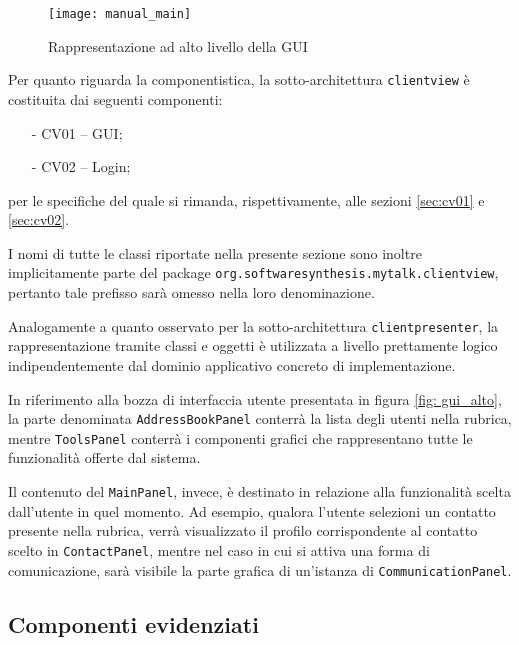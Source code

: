 \begin{figure}[h]
  \centering
  \texttt{[image: manual\_main]}
  \caption{Rappresentazione ad alto livello della GUI}\label{fig: gui_alto}
\end{figure}

Per quanto riguarda la componentistica, la sotto-architettura \texttt{clientview} è costituita dai seguenti componenti:
\begin{itemize}[noitemsep,nolistsep]
  \item[-] \textsf{CV01 -- GUI};
  \item[-] \textsf{CV02 -- Login};
\end{itemize}
per le specifiche del quale si rimanda, rispettivamente, alle sezioni \ref{sec:cv01} e \ref{sec:cv02}.

I nomi di tutte le classi riportate nella presente sezione sono inoltre implicitamente parte del package \texttt{org.softwaresynthesis.mytalk.clientview}, pertanto tale prefisso sarà omesso nella loro denominazione.

Analogamente a quanto osservato per la sotto-architettura \texttt{clientpresenter}, la rappresentazione tramite classi e oggetti è utilizzata a livello prettamente logico indipendentemente dal dominio applicativo concreto di implementazione.

In riferimento alla bozza di interfaccia utente presentata in figura \vref{fig: gui_alto}, la parte denominata \texttt{AddressBookPanel} conterrà la lista degli utenti nella rubrica, mentre \texttt{ToolsPanel} conterrà i componenti grafici che rappresentano tutte le funzionalità offerte dal sistema. 

Il contenuto del \texttt{MainPanel}, invece, è destinato in relazione alla funzionalità scelta dall'utente in quel momento. Ad esempio, qualora l'utente selezioni un contatto presente nella rubrica, verrà visualizzato il profilo corrispondente al contatto scelto in \texttt{ContactPanel}, mentre nel caso in cui si attiva una forma di comunicazione, sarà visibile la parte grafica di un'istanza di \texttt{CommunicationPanel}.

\subsection{Componenti evidenziati}


